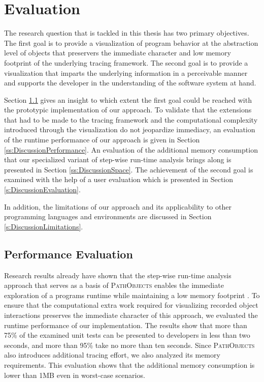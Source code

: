 \chapter{Evaluation}
\label{c:discussion}
The research question that is tackled in this thesis has two primary objectives.
The first goal is to provide a visualization of program behavior at the abstraction level of objects that preservers the immediate character and low memory footprint of the underlying tracing framework.
The second goal is to provide a visualization that imparts the underlying information in a perceivable manner and supports the developer in the understanding of the software system at hand.

Section \ref{s:DiscussionPerformance} gives an insight to which extent the first goal could be reached with the prototypic implementation of our approach.
To validate that the extensions that had to be made to the tracing framework and the computational complexity introduced through the visualization do not jeopardize immediacy, an evaluation of the runtime performance of our approach is given in Section \ref{ss:DiscussionPerformance}.
An evaluation of the additional memory consumption that our specialized variant of  step-wise run-time analysis brings along is presented in Section \ref{ss:DiscussionSpace}. 
The achievement of the second goal is examined with the help of a user evaluation which is presented in Section \ref{s:DiscussionEvaluation}.

In addition, the limitations of our approach and its applicability to other programming languages and environments are discussed in Section \ref{s:DiscussionLimitations}.

\section{Performance Evaluation}
\label{s:DiscussionPerformance}
Research results already have shown that the step-wise run-time analysis approach that serves as a basis of \textsc{PathObjects} enables the immediate exploration of a programs runtime while maintaining a low memory footprint \cite{perscheid_immediacy_2010}.
To ensure that the computational extra work required for visualizing recorded object interactions preserves the immediate character of this approach, we evaluated the runtime performance of our implementation.
The results show that more than 75\% of the examined unit tests can be presented to developers in less than two seconds, and more than 95\% take no more than ten seconds.
Since \textsc{PathObjects} also introduces additional tracing effort, we also analyzed its memory requirements.
This evaluation shows that the additional memory consumption is lower than 1MB even in worst-case scenarios.

